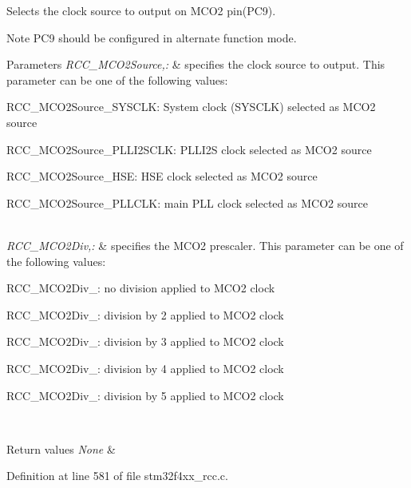 Selects the clock source to output on M\-C\-O2 pin(\-P\-C9). 

\begin{DoxyNote}{Note}
P\-C9 should be configured in alternate function mode. 
\end{DoxyNote}

\begin{DoxyParams}{Parameters}
{\em R\-C\-C\-\_\-\-M\-C\-O2\-Source,\-:} & specifies the clock source to output. This parameter can be one of the following values\-: \begin{DoxyItemize}
\item R\-C\-C\-\_\-\-M\-C\-O2\-Source\-\_\-\-S\-Y\-S\-C\-L\-K\-: System clock (S\-Y\-S\-C\-L\-K) selected as M\-C\-O2 source \item R\-C\-C\-\_\-\-M\-C\-O2\-Source\-\_\-\-P\-L\-L\-I2\-S\-C\-L\-K\-: P\-L\-L\-I2\-S clock selected as M\-C\-O2 source \item R\-C\-C\-\_\-\-M\-C\-O2\-Source\-\_\-\-H\-S\-E\-: H\-S\-E clock selected as M\-C\-O2 source \item R\-C\-C\-\_\-\-M\-C\-O2\-Source\-\_\-\-P\-L\-L\-C\-L\-K\-: main P\-L\-L clock selected as M\-C\-O2 source \end{DoxyItemize}
\\
\hline
{\em R\-C\-C\-\_\-\-M\-C\-O2\-Div,\-:} & specifies the M\-C\-O2 prescaler. This parameter can be one of the following values\-: \begin{DoxyItemize}
\item R\-C\-C\-\_\-\-M\-C\-O2\-Div\-\_\-: no division applied to M\-C\-O2 clock \item R\-C\-C\-\_\-\-M\-C\-O2\-Div\-\_\-: division by 2 applied to M\-C\-O2 clock \item R\-C\-C\-\_\-\-M\-C\-O2\-Div\-\_\-: division by 3 applied to M\-C\-O2 clock \item R\-C\-C\-\_\-\-M\-C\-O2\-Div\-\_\-: division by 4 applied to M\-C\-O2 clock \item R\-C\-C\-\_\-\-M\-C\-O2\-Div\-\_\-: division by 5 applied to M\-C\-O2 clock \end{DoxyItemize}
\\
\hline
\end{DoxyParams}

\begin{DoxyRetVals}{Return values}
{\em None} & \\
\hline
\end{DoxyRetVals}


Definition at line 581 of file stm32f4xx\-\_\-rcc.\-c.

